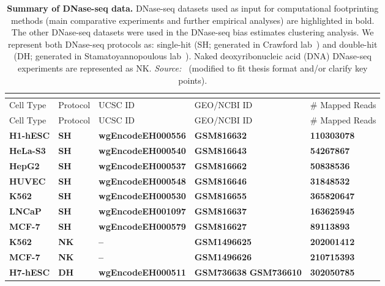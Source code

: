\begin{longtable}{p{3.5cm}p{1.2cm}p{3.7cm}p{2.5cm}p{2.8cm}}
\caption[Summary of DNase-seq data]{\textbf{Summary of DNase-seq data.} DNase-seq datasets used as input for computational footprinting methods (main comparative experiments and further empirical analyses) are highlighted in bold. The other DNase-seq datasets were used in the DNase-seq bias estimates clustering analysis. We represent both DNase-seq protocols as: single-hit (SH; generated in Crawford lab~\citep{encode2012}) and double-hit (DH; generated in Stamatoyannopoulous lab~\citep{encode2012}). Naked deoxyribonucleic acid (DNA) DNase-seq experiments are represented as NK. \emph{Source:~\cite{gusmao2016}} (modified to fit thesis format and/or clarify key points).} \\
\label{tab:dataencode.dnase} \\[-0.8cm]
\hline
Cell Type & Protocol                 & UCSC ID             & GEO/NCBI ID                    & \# Mapped Reads \\
\hline
\endfirsthead
\hline
Cell Type & Protocol                 & UCSC ID             & GEO/NCBI ID                    & \# Mapped Reads \\
\hline
\endhead
\textbf{H1-hESC} & \textbf{SH} & \textbf{wgEncodeEH000556} & \textbf{GSM816632} & \textbf{110303078} \\
\textbf{HeLa-S3} & \textbf{SH} & \textbf{wgEncodeEH000540} & \textbf{GSM816643} & \textbf{54267867} \\
\textbf{HepG2} & \textbf{SH} & \textbf{wgEncodeEH000537} & \textbf{GSM816662} & \textbf{50838536} \\
\textbf{HUVEC} & \textbf{SH} & \textbf{wgEncodeEH000548} & \textbf{GSM816646} & \textbf{31848532} \\
\textbf{K562} & \textbf{SH} & \textbf{wgEncodeEH000530} & \textbf{GSM816655} & \textbf{365820647} \\
\textbf{LNCaP} & \textbf{SH} & \textbf{wgEncodeEH001097} & \textbf{GSM816637} & \textbf{163625945} \\
\textbf{MCF-7} & \textbf{SH} & \textbf{wgEncodeEH000579} & \textbf{GSM816627} & \textbf{89113893} \\
\textbf{K562} & \textbf{NK} & \textbf{--} & \textbf{GSM1496625} & \textbf{202001412} \\
\textbf{MCF-7} & \textbf{NK} & \textbf{--} & \textbf{GSM1496626} & \textbf{210715393} \\
\textbf{H7-hESC} & \textbf{DH} & \textbf{wgEncodeEH000511} & \textbf{GSM736638} \newline \textbf{GSM736610} & \textbf{302050785} \\

\end{longtable}

